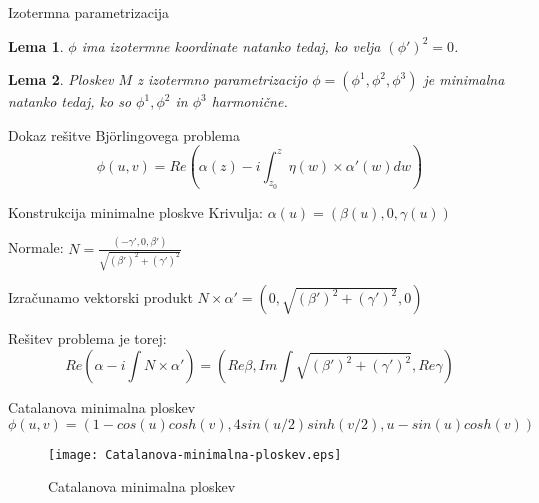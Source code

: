 \documentclass{beamer}
\newtheorem{lema}{Lema}
\begin{document}
    \begin{frame}{Izotermna parametrizacija}
        \pause
        \begin{lema}
            $\phi$ ima izotermne koordinate natanko tedaj, ko velja $(\phi')^2 = 0$.
        \end{lema}

        \pause
        \begin{lema}
            Ploskev $M$ z izotermno parametrizacijo $\phi = \left( \phi^1, \phi^2, \phi^3 \right)$
            je minimalna natanko tedaj, ko so $\phi^1, \phi^2$ in $\phi^3$ harmonične.
        \end{lema}
    \end{frame}


    \begin{frame}{Dokaz rešitve Björlingovega problema}
        $$ \phi (u, v) = Re \left( \alpha (z) - i \int_{z_0}^{z} \eta (w) \times \alpha' (w) dw \right) $$
    \end{frame}
        

    \begin{frame}{Konstrukcija minimalne ploskve}
        Krivulja: $\alpha (u) = \left( \beta (u), 0, \gamma (u) \right)$

        Normale: $N = \frac{ \left( - \gamma', 0, \beta' \right) }{ \sqrt{(\beta')^2 + (\gamma')^2 }} $

        Izračunamo vektorski produkt $N \times \alpha' = \left( 0, \sqrt{(\beta')^2 + (\gamma')^2}, 0 \right)$

        Rešitev problema je torej:
        $$ Re \left( \alpha - i \int N \times \alpha' \right) = \left( Re \beta, Im \int \sqrt{(\beta')^2 + (\gamma')^2}, Re \gamma \right)$$
    \end{frame}


    \begin{frame}{Catalanova minimalna ploskev}
        $$\phi (u, v) = \left( 1 - cos (u) cosh (v), 4 sin(u/2) sinh(v/2), u - sin (u) cosh (v) \right)$$

        \begin{figure}[h]
            \texttt{[image: Catalanova-minimalna-ploskev.eps]}
            \caption{Catalanova minimalna ploskev}
        \end{figure}
    \end{frame}
    
\end{document}
